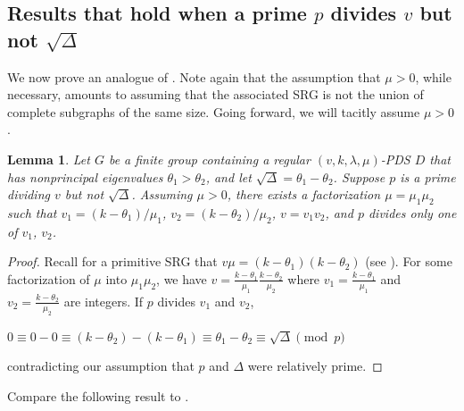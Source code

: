 \documentclass[12pt]{amsproc} %
\newtheorem{lem}[thm]{Lemma}
\theoremstyle{definition}\newtheorem{defn}[thm]{Definition}
\theoremstyle{definition}\newtheorem{rem}[thm]{Remark}
\theoremstyle{definition}\newtheorem{ex}[thm]{Example}
\begin{document}
\subsection{Results that hold when a prime $p$ divides $v$ but not $\sqrt{\Delta}$}
\label{subsec:ott2}

We now prove an analogue of \cite[Corollary 2.1]{ott}. Note again that the assumption that $\mu > 0$, while necessary, amounts to assuming that the associated SRG is not the union of complete subgraphs of the same size. Going forward, we will tacitly assume $\mu > 0$.

	\begin{lem} \label{coprime-condition}
		Let $G$ be a finite group containing a regular $(v, k, \lambda, \mu)$-PDS $D$ that has nonprincipal eigenvalues $\theta_1 > \theta_2$, and let $\sqrt{\Delta} = \theta_1 - \theta_2$. Suppose $p$ is a prime dividing $v$ but not $\sqrt{\Delta}$. Assuming $\mu > 0$, there exists a factorization $\mu = \mu_1 \mu_2$ such that $v_1 = (k - \theta_1)/\mu_1$, $v_2 = (k - \theta_2)/\mu_2$, $v = v_1 v_2$, and $p$ divides only one of $v_1$, $v_2$.
	\end{lem}

	\begin{proof}
	Recall for a primitive SRG that $v\mu = (k-\theta_1)(k-\theta_2)$ (see \cite[Section 1.1.1]{brouwer-maldeghem}). For some factorization of $\mu$ into $\mu_1\mu_2$, we have $v = \frac{k-\theta_1}{\mu_1}\frac{k-\theta_2}{\mu_2}$ where $v_1 =\frac{k-\theta_1}{\mu_1}$ and $v_2=\frac{k-\theta_2}{\mu_2}$ are integers. If $p$ divides $v_1$ and $v_2$,
		\begin{center}
			$0 \equiv 0 - 0 \equiv (k-\theta_2) - (k-\theta_1) \equiv \theta_1-\theta_2 \equiv \sqrt{\Delta}\pmod p$
		\end{center}
	contradicting our assumption that $p$ and $\Delta$ were relatively prime. 
	\end{proof}

Compare the following result to \cite[Lemma 2.4]{ott}.
\end{document}

